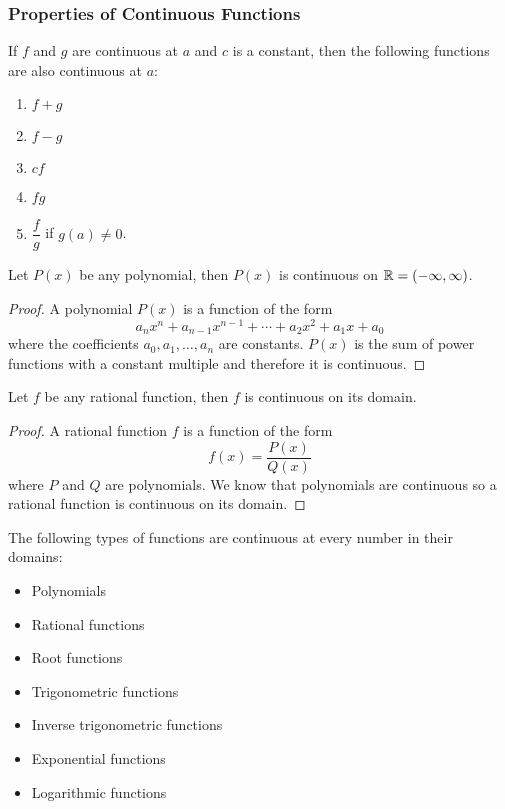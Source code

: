 \subsubsection*{Properties of Continuous Functions}
\begin{theorem}
    If \(f\) and \(g\) are continuous at \(a\) and \(c\) is a constant, then
    the following functions are also continuous at \(a\):
    \begin{enumerate}
        \item \(f+g\)
        \item \(f-g\)
        \item \(cf\)
        \item \(fg\)
        \item \(\dfrac{f}{g}\) if \(g(a)\neq 0\).
    \end{enumerate}
\end{theorem}
\begin{theorem}
    Let \(P(x)\) be any polynomial, then \(P(x)\) is continuous on
    \(\mathbb{R}=(-\infty,\infty)\).
\end{theorem}
\begin{proof}
    A polynomial \(P(x)\) is a function of the form
    \[a_nx^n+a_{n-1}x^{n-1}+\dotsb +a_{2}x^{2}+a_1x+a_0\]
    where the coefficients \(a_0,a_1,\dots,a_n\) are constants.
    \(P(x)\) is the sum of power functions with a constant multiple and
    therefore it is continuous.
\end{proof}
\begin{theorem}
    Let \(f\) be any rational function,
    then \(f\) is continuous on its domain.
\end{theorem}
\begin{proof}
    A rational function \(f\) is a function of the form
    \[f(x)=\frac{P(x)}{Q(x)}\] where \(P\) and \(Q\) are polynomials.
    We know that polynomials are continuous so a rational function is
    continuous on its domain.
\end{proof}
\begin{theorem}
    The following types of functions are continuous at every number in their
    domains:
    \begin{itemize}
        \item Polynomials
        \item Rational functions
        \item Root functions
        \item Trigonometric functions
        \item Inverse trigonometric functions
        \item Exponential functions
        \item Logarithmic functions
    \end{itemize}
\end{theorem}

